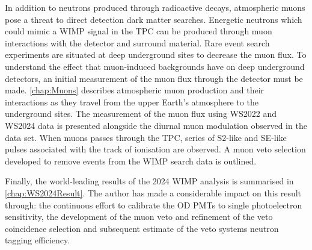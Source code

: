 In addition to neutrons produced through radioactive decays, atmospheric muons pose a threat to direct detection dark matter searches. Energetic neutrons which could mimic a WIMP signal in the TPC can be produced through muon interactions with the detector and surround material. Rare event search experiments are situated at deep underground sites to decrease the muon flux. To understand the effect that muon-induced backgrounds have on deep underground detectors, an initial measurement of the muon flux through the detector must be made. \autoref{chap:Muons} describes atmospheric muon production and their interactions as they travel from the upper Earth's atmosphere to the underground sites. The measurement of the muon flux using WS2022 and WS2024 data is presented alongside the diurnal muon modulation observed in the data set. When muons passes through the TPC, series of S2-like and SE-like pulses associated with the track of ionisation are observed. A muon veto selection developed to remove events from the WIMP search data is outlined.

Finally, the world-leading results of the 2024 WIMP analysis is summarised in \autoref{chap:WS2024Result}. The author has made a considerable impact on this result through: the continuous effort to calibrate the OD PMTs to single photoelectron sensitivity, the development of the muon veto and refinement of the veto coincidence selection and subsequent estimate of the veto systems neutron tagging efficiency.